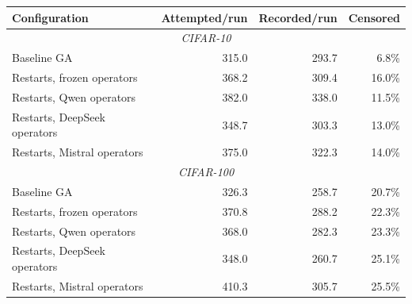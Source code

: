 \begin{center}\footnotesize
\begin{tabular}{l rr r}
\toprule
\textbf{Configuration} & \textbf{Attempted/run} & \textbf{Recorded/run} & \textbf{Censored} \\
\midrule
\multicolumn{4}{c}{\textit{CIFAR-10}} \\
\midrule
Baseline GA & 315.0 & 293.7 & 6.8\% \\
Restarts, frozen operators & 368.2 & 309.4 & 16.0\% \\
Restarts, Qwen operators & 382.0 & 338.0 & 11.5\% \\
Restarts, DeepSeek operators & 348.7 & 303.3 & 13.0\% \\
Restarts, Mistral operators & 375.0 & 322.3 & 14.0\% \\
\midrule
\multicolumn{4}{c}{\textit{CIFAR-100}} \\
\midrule
Baseline GA & 326.3 & 258.7 & 20.7\% \\
Restarts, frozen operators & 370.8 & 288.2 & 22.3\% \\
Restarts, Qwen operators & 368.0 & 282.3 & 23.3\% \\
Restarts, DeepSeek operators & 348.0 & 260.7 & 25.1\% \\
Restarts, Mistral operators & 410.3 & 305.7 & 25.5\% \\
\bottomrule
\end{tabular}
\end{center}
